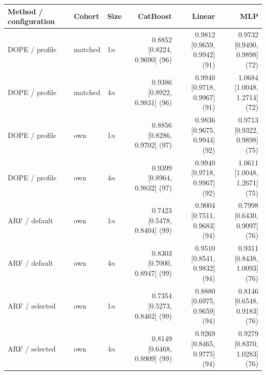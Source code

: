 \begin{tabular}{lllrrr}
\toprule
Method / configuration & Cohort & Size & CatBoost & Linear & MLP \\
\midrule
DOPE / profile & matched & 1$n$ & \shortstack{0.8852 \\ {[0.8224, 0.9690] (96)}} & \shortstack{0.9812 \\ {[0.9659, 0.9942] (91)}} & \shortstack{0.9732 \\ {[0.9490, 0.9898] (72)}} \\
DOPE / profile & matched & 4$n$ & \shortstack{0.9386 \\ {[0.8922, 0.9831] (96)}} & \shortstack{0.9940 \\ {[0.9718, 0.9967] (91)}} & \shortstack{1.0684 \\ {[1.0048, 1.2714] (72)}} \\
DOPE / profile & own & 1$n$ & \shortstack{0.8856 \\ {[0.8286, 0.9702] (97)}} & \shortstack{0.9836 \\ {[0.9675, 0.9944] (92)}} & \shortstack{0.9713 \\ {[0.9322, 0.9898] (75)}} \\
DOPE / profile & own & 4$n$ & \shortstack{0.9399 \\ {[0.8964, 0.9832] (97)}} & \shortstack{0.9940 \\ {[0.9718, 0.9967] (92)}} & \shortstack{1.0611 \\ {[1.0048, 1.2671] (75)}} \\
ARF / default & own & 1$n$ & \shortstack{0.7423 \\ {[0.5478, 0.8404] (99)}} & \shortstack{0.9004 \\ {[0.7511, 0.9683] (94)}} & \shortstack{0.7998 \\ {[0.6430, 0.9097] (76)}} \\
ARF / default & own & 4$n$ & \shortstack{0.8303 \\ {[0.7000, 0.8947] (99)}} & \shortstack{0.9510 \\ {[0.8541, 0.9832] (94)}} & \shortstack{0.9311 \\ {[0.8438, 1.0093] (76)}} \\
ARF / selected & own & 1$n$ & \shortstack{0.7354 \\ {[0.5273, 0.8462] (99)}} & \shortstack{0.8880 \\ {[0.6975, 0.9659] (94)}} & \shortstack{0.8146 \\ {[0.6548, 0.9183] (76)}} \\
ARF / selected & own & 4$n$ & \shortstack{0.8149 \\ {[0.6468, 0.8909] (99)}} & \shortstack{0.9269 \\ {[0.8465, 0.9775] (94)}} & \shortstack{0.9279 \\ {[0.8370, 1.0283] (76)}} \\

\end{tabular}
